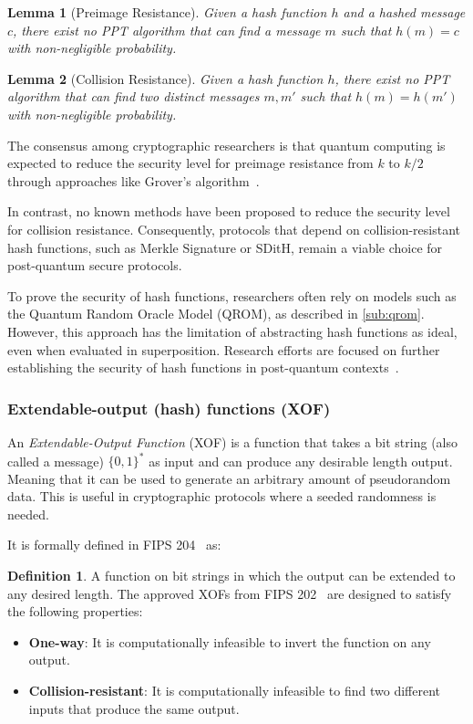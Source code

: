 \documentclass[11pt]{report}
\theoremstyle{definition}
\newtheorem{definition}{Definition}[section]
\theoremstyle{plain}
\newtheorem{lemma}{Lemma}[section]
\begin{document}
\begin{lemma}[Preimage Resistance]\label{lem:preimage}
  Given a hash function $h$ and a hashed message $c$, there exist no PPT algorithm that can find a message $m$ such that $h(m) = c$ with non-negligible probability.
\end{lemma}

\begin{lemma}[Collision Resistance]\label{lem:collision}
  Given a hash function $h$, there exist no PPT algorithm that can find two distinct messages $m, m'$ such that $h(m) = h(m')$ with non-negligible probability.
\end{lemma}

The consensus among cryptographic researchers is that quantum computing is expected to reduce the security level for preimage resistance from $k$ to $k/2$ through approaches like Grover's algorithm~\cite{nielsen2010quantumgrover}.

In contrast, no known methods have been proposed to reduce the security level for collision resistance. Consequently, protocols that depend on collision-resistant hash functions, such as Merkle Signature or SDitH, remain a viable choice for post-quantum secure protocols.

To prove the security of hash functions, researchers often rely on models such as the Quantum Random Oracle Model (QROM), as described in \autoref{sub:qrom}. However, this approach has the limitation of abstracting hash functions as ideal, even when evaluated in superposition. Research efforts are focused on further establishing the security of hash functions in post-quantum contexts~\cite{dtuPostquantumSecurity}.


\subsubsection{Extendable-output (hash) functions (XOF)}\label{sec:xof}
An \textit{Extendable-Output Function} (XOF) is a function that takes a bit string (also called a message) $\{0,1\}^*$ as input and can produce any desirable length output. Meaning that it can be used to generate an arbitrary amount of pseudorandom data. This is useful in cryptographic protocols where a seeded randomness is needed.

It is formally defined in FIPS 204~\cite{FIPS204_2024} as:
\begin{definition}
  A function on bit strings in which the output can be extended to any desired length. The approved XOFs from FIPS 202~\cite{FIPS202_2015} are designed to satisfy the following properties:
  \begin{itemize}
    \item \textbf{One-way}: It is computationally infeasible to invert the function on any output.
    \item \textbf{Collision-resistant}: It is computationally infeasible to find two different inputs that produce the same output.
  \end{itemize}
\end{definition}
\end{document}
